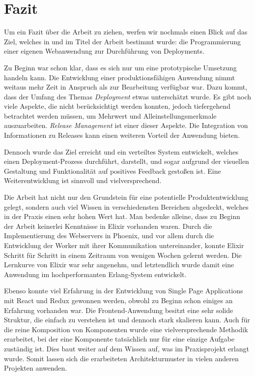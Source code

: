 \chapter{Fazit}

Um ein Fazit über die Arbeit zu ziehen, werfen wir nochmals einen Blick auf das Ziel, welches in  und im Titel der Arbeit bestimmt wurde: die Programmierung einer eigenen Webanwendung zur Durchführung von Deployments.

Zu Beginn war schon klar, dass es sich nur um eine prototypische Umsetzung handeln kann. Die Entwicklung einer produktionsfähigen Anwendung nimmt weitaus mehr Zeit in Anspruch als zur Bearbeitung verfügbar war. Dazu kommt, dass der Umfang des Themas \emph{Deployment} etwas unterschätzt wurde. Es gibt noch viele Aspekte, die nicht berücksichtigt werden konnten, jedoch tiefergehend betrachtet werden müssen, um Mehrwert und Alleinstellungsmerkmale auszuarbeiten. \emph{Release Management} ist einer dieser Aspekte. Die Integration von Informationen zu Releases kann einen weiteren Vorteil der Anwendung bieten.

Dennoch wurde das Ziel erreicht und ein verteiltes System entwickelt, welches einen Deployment-Prozess durchführt, darstellt, und sogar aufgrund der visuellen Gestaltung und Funktionalität auf positives Feedback gestoßen ist. Eine Weiterentwicklung ist sinnvoll und vielversprechend.

Die Arbeit hat nicht nur den Grundstein für eine potentielle Produktentwicklung gelegt, sondern auch viel Wissen in verschiedensten Bereichen abgedeckt, welches in der Praxis einen sehr hohen Wert hat. Man bedenke alleine, dass zu Beginn der Arbeit keinerlei Kenntnisse in Elixir vorhanden waren. Durch die Implementierung des Webservers in Phoenix, und vor allem durch die Entwicklung der Worker mit ihrer Kommunikation untereinander, konnte Elixir Schritt für Schritt in einem Zeitraum von wenigen Wochen gelernt werden. Die Lernkurve von Elixir war sehr angenehm, und letztendlich wurde damit eine Anwendung im hochperformanten Erlang-System entwickelt.

Ebenso konnte viel Erfahrung in der Entwicklung von Single Page Applications mit React und Redux gewonnen werden, obwohl zu Beginn schon einiges an Erfahrung vorhanden war. Die Frontend-Anwendung besitzt eine sehr solide Struktur, die einfach zu verstehen ist und dennoch stark skalieren kann. Auch für die reine Komposition von Komponenten wurde eine vielversprechende Methodik erarbeitet, bei der eine Komponente tatsächlich nur für eine einzige Aufgabe zuständig ist. Dies baut weiter auf dem Wissen auf, was im Praxisprojekt erlangt wurde. Somit lassen sich die erarbeiteten Architekturmuster in vielen anderen Projekten anwenden.

